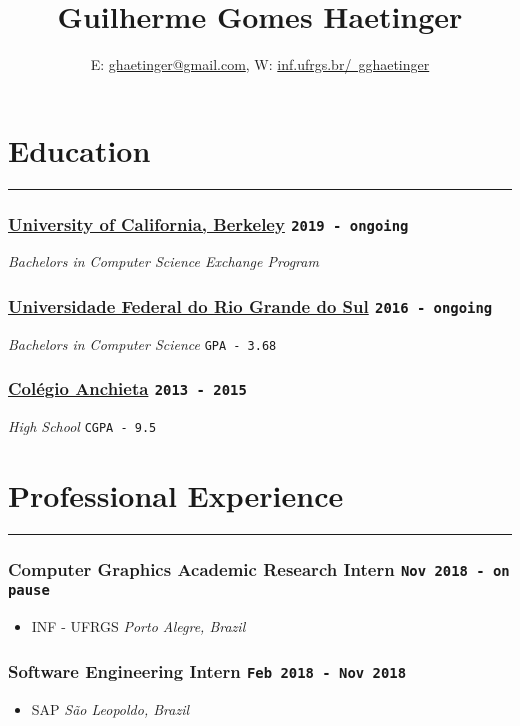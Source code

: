 \documentclass[11pt]{article}
\author{E: \href{mailto:ghaetinger@gmail.com}{ghaetinger@gmail.com}, W: \href{inf.ufrgs.br/~gghaetinger}{inf.ufrgs.br/~gghaetinger}}
\date{}
\title{\huge \textbf{Guilherme Gomes Haetinger}}
\begin{document}
\maketitle


\section*{Education}
\label{sec:org216af15}
\hrule
\vspace{10pt}

\subsubsection*{\underline{University of California, Berkeley} \hfill \texttt{2019 - ongoing}}
\label{sec:orgdb15dfe}
\emph{Bachelors in Computer Science Exchange Program} \hfill

\subsubsection*{\underline{Universidade Federal do Rio Grande do Sul} \hfill \texttt{2016 - ongoing}}
\label{sec:orgf1f9c85}
\emph{Bachelors in Computer Science} \hfill \texttt{GPA - 3.68}

\subsubsection*{\underline{Colégio Anchieta} \hfill \texttt{2013 - 2015}}
\label{sec:org787d760}
\emph{High School} \hfill \texttt{CGPA - 9.5}

\vspace{20pt}
\section*{Professional Experience}
\label{sec:org851709e}
\hrule
\vspace{10pt}

\subsubsection*{Computer Graphics Academic Research Intern \hfill \texttt{Nov 2018 - on pause}}
\label{sec:orgc266296}
\begin{itemize}
\item INF - UFRGS \hfill \emph{Porto Alegre, Brazil}
\label{sec:orgd5400d1}
\end{itemize}

\subsubsection*{Software Engineering Intern \hfill \texttt{Feb 2018 - Nov 2018}}
\label{sec:orgf6427fc}
\begin{itemize}
\item SAP \hfill \emph{São Leopoldo, Brazil}
\label{sec:orgf1f4077}
\end{itemize}
\end{document}
